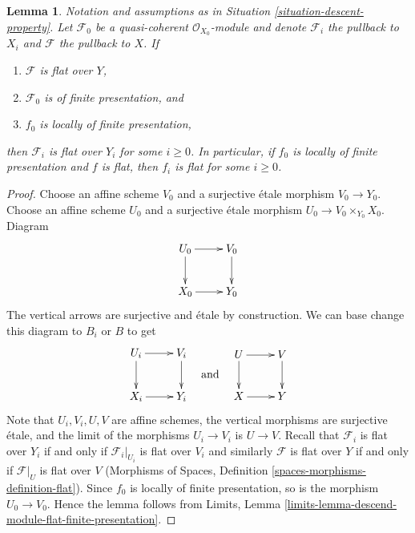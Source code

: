 \documentclass{stacks-project}
\theoremstyle{plain}
\newtheorem{lemma}[subsection]{Lemma}
\theoremstyle{definition}
\theoremstyle{remark}
\numberwithin{equation}{subsection}
\begin{document}
\begin{lemma}
\label{lemma-descend-flat}
Notation and assumptions as in Situation \ref{situation-descent-property}.
Let $\mathcal{F}_0$ be a quasi-coherent $\mathcal{O}_{X_0}$-module
and denote $\mathcal{F}_i$ the pullback to $X_i$ and $\mathcal{F}$
the pullback to $X$. If
\begin{enumerate}
\item $\mathcal{F}$ is flat over $Y$,
\item $\mathcal{F}_0$ is of finite presentation, and
\item $f_0$ is locally of finite presentation,
\end{enumerate}
then $\mathcal{F}_i$ is flat over $Y_i$ for some $i \geq 0$.
In particular, if $f_0$ is locally of finite presentation and
$f$ is flat, then $f_i$ is flat for some $i \geq 0$.
\end{lemma}

\begin{proof}
Choose an affine scheme $V_0$ and a surjective \'etale morphism
$V_0 \to Y_0$. Choose an affine scheme $U_0$ and a surjective \'etale
morphism $U_0 \to V_0 \times_{Y_0} X_0$. Diagram
$$
\xymatrix{
U_0 \ar[d] \ar[r] & V_0 \ar[d] \\
X_0 \ar[r] & Y_0
}
$$
The vertical arrows are surjective and \'etale by construction.
We can base change this diagram to $B_i$ or $B$ to get
$$
\vcenter{
\xymatrix{
U_i \ar[d] \ar[r] & V_i \ar[d] \\
X_i \ar[r] & Y_i
}
}
\quad\text{and}\quad
\vcenter{
\xymatrix{
U \ar[d] \ar[r] & V \ar[d] \\
X \ar[r] & Y
}
}
$$
Note that $U_i, V_i, U, V$ are affine schemes, the vertical morphisms are
surjective \'etale, and the limit of the morphisms $U_i \to V_i$ is
$U \to V$. Recall that $\mathcal{F}_i$ is flat over $Y_i$ if and only if
$\mathcal{F}_i|_{U_i}$ is flat over $V_i$ and similarly $\mathcal{F}$ is flat
over $Y$ if and only if $\mathcal{F}|_U$ is flat over $V$
(Morphisms of Spaces, Definition \ref{spaces-morphisms-definition-flat}).
Since $f_0$ is locally of finite presentation, so is the morphism
$U_0 \to V_0$. Hence the lemma follows
from Limits, Lemma \ref{limits-lemma-descend-module-flat-finite-presentation}.
\end{proof}
\end{document}

